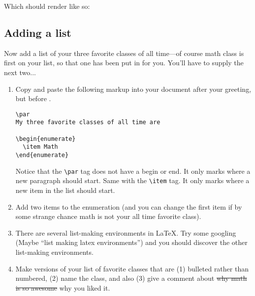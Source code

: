 \clearpage

Which should render like so:


\begin{center}
\end{center}


\subsection*{Adding a list}

Now add a list of your three favorite classes of all time---of course
math class is first on your list, so that one has been put in for
you. You'll have to supply the next two...

\begin{enumerate}
\setcounter{enumi}{\value{interitemtemp}}

\item Copy and paste the following markup into your document 
after your greeting, but before \verb++.
\bigskip

\begin{codeblock}
\begin{verbatim}
\par
My three favorite classes of all time are

\begin{enumerate}
  \item Math
\end{enumerate}
\end{verbatim}
\end{codeblock}
\bigskip

Notice that the \verb+\par+ tag does not have a begin
or end. It only marks where a new paragraph should start. Same with
the \verb+\item+ tag. It only marks where a new item
in the list should start.
\item Add two items to the enumeration (and you can change the first item
if by some strange chance math is not your all time favorite class).
\item There are several list-making environments in \LaTeX.  Try some googling (Maybe ``list making latex environments'') 
and you should discover the other list-making environments.
\item Make versions of your list of favorite classes that are (1) bulleted rather than numbered, (2) name the class, and also (3) give a comment about \sout{why math is so awesome} why you liked it.
\setcounter{interitemtemp}{\value{enumi}}
\end{enumerate}

